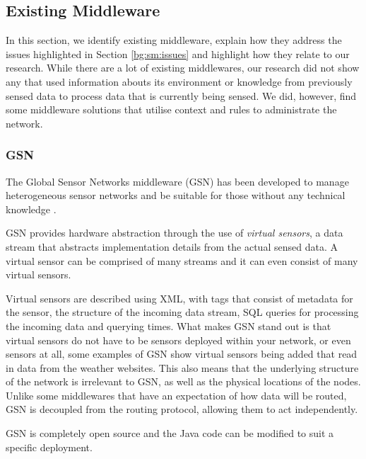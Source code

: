 \subsection{Existing Middleware}\label{sec:middleware}
	In this section, we identify existing middleware, explain how they address the issues highlighted in Section \ref{bg:sm:issues} and highlight how they relate to our research. While there are a lot of existing middlewares, our research did not show any that used information abouts its environment or knowledge from previously sensed data to process data that is currently being sensed. We did, however, find some middleware solutions that utilise context and rules to administrate the network.

	\subsubsection{GSN}\label{sec:GSN}
		The Global Sensor Networks middleware (GSN) has been developed to manage heterogeneous sensor networks and be suitable for those without any technical knowledge \cite{F2006}.

GSN provides hardware abstraction through the use of  \textit{virtual sensors}, a data stream that abstracts implementation details from the actual sensed data. A virtual sensor can be comprised of many streams and it can even consist of many virtual sensors. 

Virtual sensors are described using XML, with tags that consist of metadata for the sensor, the structure of the incoming data stream, SQL queries for processing the incoming data and querying times. What makes GSN stand out is that virtual sensors do not have to be sensors deployed within your network, or even sensors at all, some examples of GSN show virtual sensors being added that read in data from the weather websites. This also means that the underlying structure of the network is irrelevant to GSN, as well as the physical locations of the nodes. Unlike some middlewares that have an expectation of how data will be routed, GSN is decoupled from the routing protocol, allowing them to act independently.

GSN is completely open source and the Java code can be modified to suit a specific deployment. 

